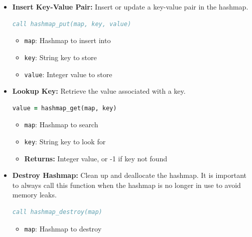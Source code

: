 \documentclass[11pt]{article}
\begin{document}
\begin{enumerate}
\begin{enumerate}
\begin{itemize}
	      	      	\item \textbf{Insert Key-Value Pair:} Insert or update a key-value pair in the hashmap. 
                          \begin{lstlisting}[language=Fortran]
call hashmap_put(map, key, value)
	      	      	\end{lstlisting}
	      	      	\begin{itemize}
	      	      		\item \texttt{map}: Hashmap to insert into
	      	      		      
	      	      		\item \texttt{key}: String key to store
	      	      		      
	      	      		\item \texttt{value}: Integer value to store
	      	      	\end{itemize}
	      	      	
	      	      	\item \textbf{Lookup Key:} Retrieve the value associated with a key.
	      	      	      \begin{lstlisting}[language=Fortran]
value = hashmap_get(map, key)
	      	      	      \end{lstlisting}
	      	      	      \begin{itemize}
	      	      	      	\item \texttt{map}: Hashmap to search
	      	      	      	      
	      	      	      	\item \texttt{key}: String key to look for
	      	      	      	      
	      	      	      	\item \textbf{Returns:} Integer value, or -1 if key not found
	      	      	      \end{itemize}
	      	      	      
	      	      	\item \textbf{Destroy Hashmap:} Clean up and deallocate the hashmap.
	      	      	      It is important to always call this function when the hashmap is no
	      	      	      longer in use to avoid memory leaks.
	      	      	      \begin{lstlisting}[language=Fortran]
call hashmap_destroy(map)
	      	      	      \end{lstlisting}
	      	      	      \begin{itemize}
	      	      	      	\item \texttt{map}: Hashmap to destroy
	      	      	      \end{itemize}
	      	      \end{itemize}
	      	      

\end{enumerate}
\end{enumerate}
\end{document}
